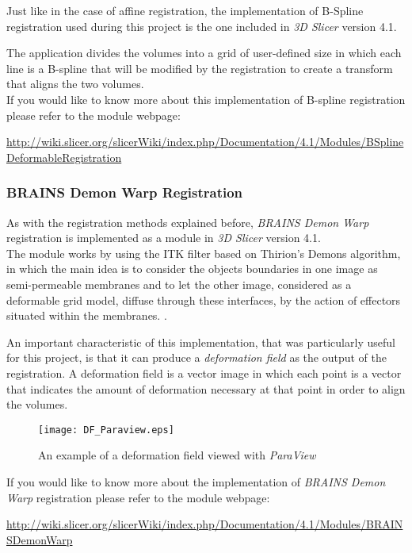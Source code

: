 Just like in the case of affine registration, the implementation of
B-Spline registration used during this project is the one included in
\textit{3D Slicer} version 4.1. 

The application divides the volumes into a grid of user-defined size
in which each line is a B-spline that will be modified by the
registration to create a transform that aligns the two volumes.\\

If you would like to know more about this implementation of B-spline
registration please refer to the module webpage:

\url{http://wiki.slicer.org/slicerWiki/index.php/Documentation/4.1/Modules/BSplineDeformableRegistration}


\subsubsection{BRAINS Demon Warp Registration}
\label{sec:demon_warp}
As with the registration methods explained before, \textit{BRAINS
  Demon Warp} registration is implemented as a module in \textit{3D
  Slicer} version
4.1.\\

The module works by using the ITK filter based on Thirion's Demons
algorithm, in which the main idea is to consider the objects
boundaries in one image as semi-permeable membranes and to let the
other image, considered as a deformable grid model, diffuse through
these interfaces, by the action of effectors situated within the
membranes. \cite{thirion}.

An important characteristic of this implementation, that was
particularly useful for this project, is that it can produce a
\textit{deformation field} as the output of the registration. A
deformation field is a vector image in which each point is a vector
that indicates the amount of deformation necessary
at that point in order to align the volumes.\\

\begin{figure}[H]
  \centering
  \texttt{[image: DF\_Paraview.eps]}
  \caption{An example of a deformation field viewed with \textit{ParaView}}
  \label{voxel_ex_5}
\end{figure}


If you would like to know more about the implementation of
\textit{BRAINS Demon Warp} registration please refer to the module
webpage:

\url{http://wiki.slicer.org/slicerWiki/index.php/Documentation/4.1/Modules/BRAINSDemonWarp}


